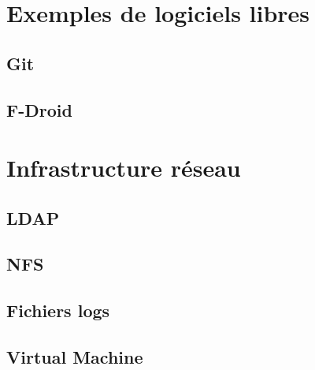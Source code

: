 \documentclass[a4paper, 12pt, titlepage]{article}
\begin{document}
\newpage
\section{Exemples de logiciels libres}
	
  \subsection{Git}
    
  \subsection{F-Droid}
    

\newpage
\section{Infrastructure réseau}
  \subsection{LDAP}\label{subsec:ldap}
    
  \subsection{NFS}
    
  \subsection{Fichiers logs}
    
  \subsection{Virtual Machine}
    
\end{document}
